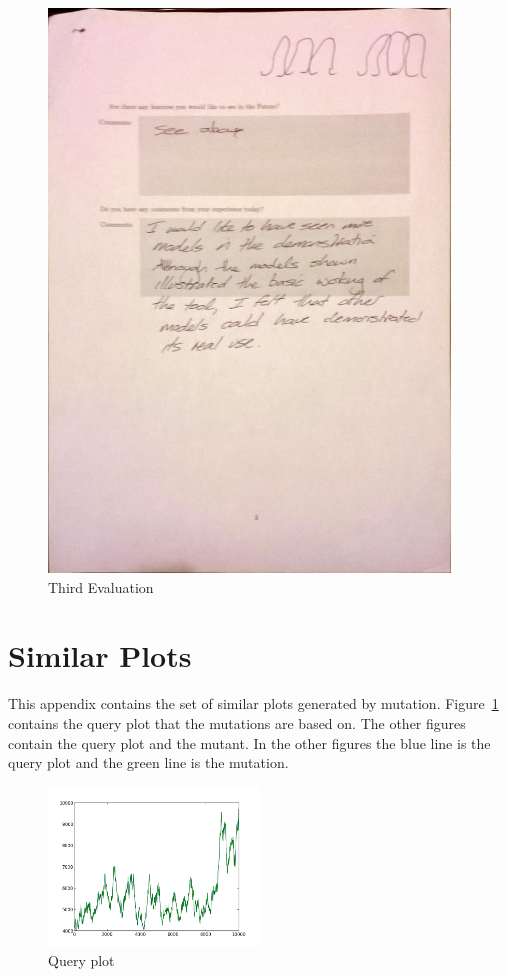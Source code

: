 \begin{figure}[h!]
    \centering
    \includegraphics[width=0.95\textwidth]{images/user_eval/user_eval_23.jpg}
    \caption{Third Evaluation}
\end{figure}

\clearpage

\section{Similar Plots}
\label{sec:mutants}

This appendix contains the set of similar plots generated by mutation.  Figure~\ref{fig:query} contains the query plot that the mutations are based on.  The other figures contain the query plot and the mutant.  In the other figures the blue line is the query plot and the green line is the mutation.

\begin{figure}[h!]
    \centering
    \includegraphics[width=0.5\textwidth]{images/query.png}
    \caption{Query plot}
    \label{fig:query}
\end{figure}

